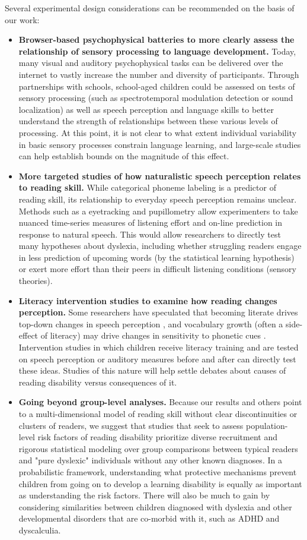 \documentclass[../uwthesis.tex]{subfiles}
\begin{document}
Several experimental design considerations can be recommended on the basis of our work:
\begin{itemize}
    \item \textbf{Browser-based psychophysical batteries to more clearly assess the relationship of sensory processing to language development.} Today, many visual and auditory psychophysical tasks can be delivered over the internet to vastly increase the number and diversity of participants. Through partnerships with schools, school-aged children could be assessed on tests of sensory processing (such as spectrotemporal modulation detection or sound localization) as well as speech perception and language skills to better understand the strength of relationships between these various levels of processing. At this point, it is not clear to what extent individual variability in basic sensory processes constrain language learning, and large-scale studies can help establish bounds on the magnitude of this effect. 
    \item \textbf{More targeted studies of how naturalistic speech perception relates to reading skill.} While categorical phoneme labeling is a predictor of reading skill, its relationship to everyday speech perception remains unclear. Methods such as a eyetracking and pupillometry allow experimenters to take nuanced time-series measures of listening effort and on-line prediction in response to natural speech. This would allow researchers to directly test many hypotheses about dyslexia, including whether struggling readers engage in less prediction of upcoming words (by the statistical learning hypothesis) or exert more effort than their peers in difficult listening conditions (sensory theories). 
    \item \textbf{Literacy intervention studies to examine how reading changes perception.} Some researchers have speculated that becoming literate drives top-down changes in speech perception \citep{Huettig2019LiteracyLanguage}, and vocabulary growth (often a side-effect of literacy) may drive changes in sensitivity to phonetic cues \citep{Cleary2001}. Intervention studies in which children receive literacy training and are tested on speech perception or auditory measures before and after can directly test these ideas. Studies of this nature will help settle debates about causes of reading disability versus consequences of it.
    \item \textbf{Going beyond group-level analyses.} Because our results and others point to a multi-dimensional model of reading skill without clear discontinuities or clusters of readers, we suggest that studies that seek to assess population-level risk factors of reading disability prioritize diverse recruitment and rigorous statistical modeling over group comparisons between typical readers and "pure dyslexic" individuals without any other known diagnoses. In a probabilistic framework, understanding what protective mechanisms prevent children from going on to develop a learning disability is equally as important as understanding the risk factors. There will also be much to gain by considering similarities between children diagnosed with dyslexia and other developmental disorders that are co-morbid with it, such as ADHD and dyscalculia. 
    

\end{itemize}
\end{document}

